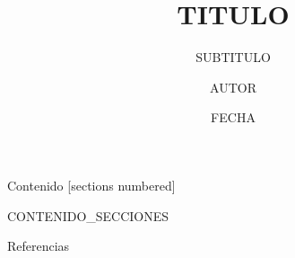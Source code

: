 \documentclass[10pt]{beamer}
\title{{{TITULO}}}
\subtitle{{{SUBTITULO}}}
\date{{{FECHA}}}
\author{{{AUTOR}}}
\institute{{{INSTITUCION}}}
\begin{document}
\maketitle

\begin{frame}{Contenido}
  [sections numbered]
  \tableofcontents[hideallsubsections]
\end{frame}

%
%
%
%
%   

{{CONTENIDO_SECCIONES}}

\begin{frame}[allowframebreaks]{Referencias}
  \nocite{*}
  
  
\end{frame}
\end{document}
